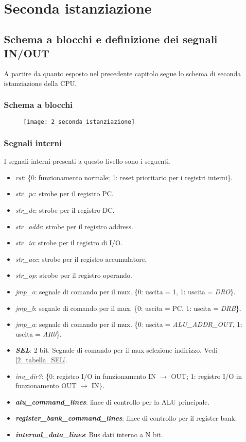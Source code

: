 \chapter{Seconda istanziazione}
\section{Schema a blocchi e definizione dei segnali IN/OUT}
A partire da quanto esposto nel precedente capitolo segue lo schema di seconda istanziazione della CPU.
\subsection{Schema a blocchi}
\begin{figure}[H]
	\centering
	\texttt{[image: 2\_seconda\_istanziazione]}
	\label{fig:seconda_istanziazione}
\end{figure}

\newpage
\subsection{Segnali interni}
I segnali interni presenti a questo livello sono i seguenti.
\begin{itemize}
	\item \textit{rst}: \{0: funzionamento normale; 1: reset prioritario per i registri interni\}.
	\item \textit{str\_pc}: strobe per il registro PC.
	\item \textit{str\_dc}: strobe per il registro DC.
	\item \textit{str\_addr}: strobe per il registro address.
	\item \textit{str\_io}: strobe per il registro di I/O.
	\item \textit{str\_acc}: strobe per il registro accumulatore.
	\item \textit{str\_op}: strobe per il registro operando.
	\item \textit{jmp\_o}: segnale di comando per il mux. \{0: uscita = 1, 1: uscita = \textit{DRO}\}.
	\item \textit{jmp\_b}: segnale di comando per il mux. \{0: uscita = PC, 1: uscita = \textit{DRB}\}.
	\item \textit{jmp\_a}: segnale di comando per il mux. \{0: uscita = \textit{ALU\_ADDR\_OUT}, 1: uscita = \textit{AR0}\}.
	\item \textit{\textbf{SEL}}: 2 bit. Segnale di comando per il mux selezione indirizzo. Vedi \ref{2_tabella_SEL}.
	\item \textit{inv\_dir?}: \{0: registro I/O in funzionamento IN $\rightarrow$ OUT; 1: registro I/O in funzionamento OUT $\rightarrow$ IN\}.
	\item \textit{\textbf{alu\_command\_lines}}: linee di controllo per la ALU principale.
	\item \textit{\textbf{register\_bank\_command\_lines}}: linee di controllo per il register bank.
	\item \textit{\textbf{internal\_data\_lines}}: Bus dati interno a N bit.
\end{itemize}

